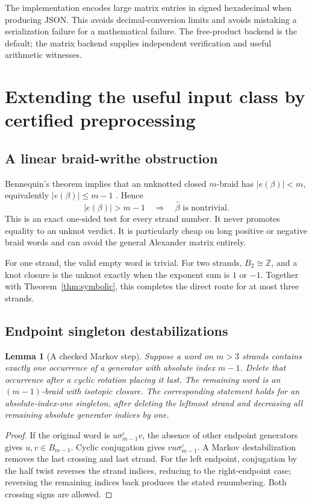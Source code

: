 \documentclass[11pt,letterpaper]{article}
\newtheorem{lemma}[theorem]{Lemma}
\theoremstyle{definition}
\newcommand{\Z}{\mathbb Z}
\begin{document}
The implementation encodes large matrix entries in signed hexadecimal
when producing JSON. This avoids decimal-conversion limits and avoids
mistaking a serialization failure for a mathematical failure.
The free-product backend is the default; the matrix backend supplies
independent verification and useful arithmetic witnesses.

\section{Extending the useful input class by certified preprocessing}
\label{sec:markov}

\subsection{A linear braid-writhe obstruction}

Bennequin's theorem implies that an unknotted closed \(m\)-braid has
\(|e(\beta)|<m\), equivalently \(|e(\beta)|\le m-1\)
\cite[pp.~100--101]{bennequin}. Hence
\[
              |e(\beta)|>m-1\quad\Longrightarrow\quad
              \widehat\beta\text{ is nontrivial}.
\]
This is an exact one-sided test for every strand number.
It never promotes equality to an unknot verdict. It is particularly cheap
on long positive or negative braid words and can avoid the general
Alexander matrix entirely.

For one strand, the valid empty word is trivial. For two strands,
\(B_2\cong\Z\), and a knot closure is the unknot exactly when
the exponent sum is \(1\) or \(-1\). Together with
Theorem~\ref{thm:symbolic}, this completes the direct route for at most
three strands.

\subsection{Endpoint singleton destabilizations}

\begin{lemma}[A checked Markov step]
\label{lem:singleton}
Suppose a word on \(m>3\) strands contains exactly one occurrence of a
generator with absolute index \(m-1\). Delete that occurrence after a
cyclic rotation placing it last. The remaining word is an
\((m-1)\)-braid with isotopic closure. The corresponding statement holds
for an absolute-index-one singleton, after deleting the leftmost strand
and decreasing all remaining absolute generator indices by one.
\end{lemma}
\begin{proof}
If the original word is \(u\sigma_{m-1}^{\varepsilon}v\), the absence of
other endpoint generators gives \(u,v\in B_{m-1}\).
Cyclic conjugation gives \(vu\sigma_{m-1}^{\varepsilon}\).
A Markov destabilization removes the last crossing and last strand.
For the left endpoint, conjugation by the half twist reverses the strand
indices, reducing to the right-endpoint case; reversing the remaining
indices back produces the stated renumbering.
Both crossing signs are allowed.
\end{proof}
\end{document}
